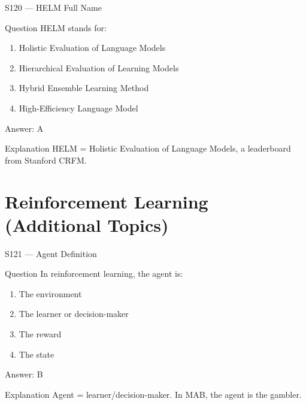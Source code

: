 \documentclass[aspectratio=169,8pt]{beamer}
\begin{document}
	\begin{frame}{S120 --- HELM Full Name}
		\begin{block}{Question}
			HELM stands for:
			\begin{enumerate}
				\item Holistic Evaluation of Language Models
				\item Hierarchical Evaluation of Learning Models
				\item Hybrid Ensemble Learning Method
				\item High-Efficiency Language Model
			\end{enumerate}
		\end{block}
		\begin{exampleblock}{Answer: A}\end{exampleblock}
		\begin{block}{Explanation}
			HELM = Holistic Evaluation of Language Models, a leaderboard from Stanford CRFM.
		\end{block}
	\end{frame}
	
	\section{Reinforcement Learning (Additional Topics)}
	
	\begin{frame}{S121 --- Agent Definition}
		\begin{block}{Question}
			In reinforcement learning, the agent is:
			\begin{enumerate}
				\item The environment
				\item The learner or decision-maker
				\item The reward
				\item The state
			\end{enumerate}
		\end{block}
		\begin{exampleblock}{Answer: B}\end{exampleblock}
		\begin{block}{Explanation}
			Agent = learner/decision-maker. In MAB, the agent is the gambler.
		\end{block}
	\end{frame}
	
\end{document}
